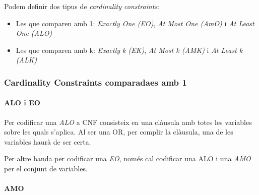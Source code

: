 \documentclass[11pt,a4paper,twoside]{report}
\begin{document}
  Podem definir dos tipus de \textit{cardinality constraints}:
  \begin{itemize}
    \item Les que comparen amb 1: \textit{Exactly One (EO)}, \textit{At Most One (AmO)} i \textit{At Least One (ALO)}
    \item Les que comparen amb k: \textit{Exactly k (EK)}, \textit{At Most k (AMK)} i \textit{At Least k (ALK)}
  \end{itemize}

  \subsubsection{Cardinality Constraints comparadaes amb 1}

  \paragraph*{ALO i EO}
  
  Per codificar una \textit{ALO} a CNF consisteix en una clàusula amb totes les variables sobre les quals s'aplica. Al ser una OR, per complir la clàusula, una de les variables haurà de ser certa.

  Per altre banda per codificar una \textit{EO}, només cal codificar una ALO i una \textit{AMO} per el conjunt de variables.
  
  \paragraph*{AMO}
\end{document}
